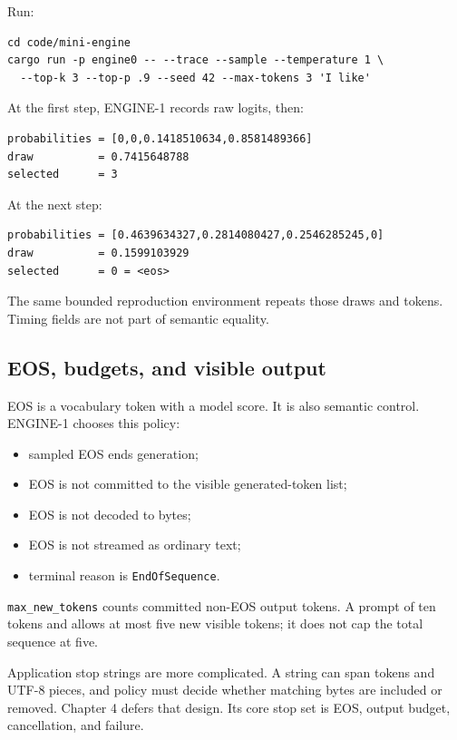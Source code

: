 \documentclass[
  10pt,
]{article}
\providecommand{\tightlist}{%
  \setlength{\itemsep}{0pt}\setlength{\parskip}{0pt}}
\begin{document}
Run:

\begin{verbatim}
cd code/mini-engine
cargo run -p engine0 -- --trace --sample --temperature 1 \
  --top-k 3 --top-p .9 --seed 42 --max-tokens 3 'I like'
\end{verbatim}

At the first step, ENGINE-1 records raw logits, then:

\begin{verbatim}
probabilities = [0,0,0.1418510634,0.8581489366]
draw          = 0.7415648788
selected      = 3
\end{verbatim}

At the next step:

\begin{verbatim}
probabilities = [0.4639634327,0.2814080427,0.2546285245,0]
draw          = 0.1599103929
selected      = 0 = <eos>
\end{verbatim}

The same bounded reproduction environment repeats those draws and
tokens. Timing fields are not part of semantic equality.

\subsection{EOS, budgets, and visible
output}\label{eos-budgets-and-visible-output}

EOS is a vocabulary token with a model score. It is also semantic
control. ENGINE-1 chooses this policy:

\begin{itemize}
\tightlist
\item
  sampled EOS ends generation;
\item
  EOS is not committed to the visible generated-token list;
\item
  EOS is not decoded to bytes;
\item
  EOS is not streamed as ordinary text;
\item
  terminal reason is \texttt{EndOfSequence}.
\end{itemize}

\texttt{max\_new\_tokens} counts committed non-EOS output tokens. A
prompt of ten tokens and \texttt{\seqsplit{max\_new\_tokens=5}} allows
at most five new visible tokens; it does not cap the total sequence at
five.

Application stop strings are more complicated. A string can span tokens
and UTF-8 pieces, and policy must decide whether matching bytes are
included or removed. Chapter 4 defers that design. Its core stop set is
EOS, output budget, cancellation, and failure.
\end{document}
